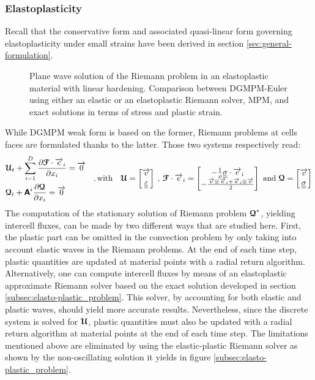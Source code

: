 \subsubsection{Elastoplasticity}
Recall that the conservative form and associated quasi-linear form governing elastoplasticity under small strains have been derived in section \ref{sec:general-formulation}.
\begin{figure}[h!]
  \centering
  { \label{subfig:ep_dgmpm_mpm1}}
  { \label{subfig:ep_dgmpm_mpm3}}
  {}
  \caption{Plane wave solution of the Riemann problem in an elastoplastic material with linear hardening. Comparison between DGMPM-Euler using either an elastic or an elastoplastic Riemann solver, MPM, and exact solutions in terms of stress and plastic strain.}
  \label{fig:RP_EP_dgmpm_mpm}
\end{figure}
While DGMPM weak form is based on the former, Riemann problems at cells faces are formulated thanks to the latter. Those two systems respectively read:
\begin{equation*}
  \begin{aligned}
  & {\boldsymbol{\mathcal{U}}}_t + \sum_{i=1}^D \frac{\partial {\boldsymbol{\mathcal{F}}}\cdot {\overrightarrow{e}}_i}{\partial x_i} = {\overrightarrow{0}} \\
  & {\boldsymbol{\mathcal{Q}}}_t + \boldsymbol{\mathsf{A}}^i \frac{\partial {\boldsymbol{\mathcal{Q}}}}{\partial x_i} = {\overrightarrow{0}}
  \end{aligned} \quad,\text{with}\quad {\boldsymbol{\mathcal{U}}} =\left[\begin{matrix}{\overrightarrow{v}} \\ {\underline{\underline{\varepsilon}}}\end{matrix}\right] \:,\: {\boldsymbol{\mathcal{F}}}\cdot{\overrightarrow{e}}_i = \left[\begin{matrix}-\frac{1}{\rho}{\underline{\underline{\sigma}}}\cdot{\overrightarrow{e}}_i\\-\frac{{\overrightarrow{v}}\otimes{\overrightarrow{e}}_i +{\overrightarrow{e}}_i \otimes{\overrightarrow{v}} }{2} \end{matrix}\right] \text{ and } {\boldsymbol{\mathcal{Q}}}=\left[\begin{matrix}{\overrightarrow{v}}\\ {\underline{\underline{\sigma}}}\end{matrix}\right]
\end{equation*}
The computation of the stationary solution of Riemann problem ${\boldsymbol{\mathcal{Q}}}^*$, yielding intercell fluxes, can be made by two different ways that are studied here.
First, the plastic part can be omitted in the convection problem by only taking into account elastic waves in the Riemann problems. At the end of each time step, plastic quantities are updated at material points with a radial return algorithm. %
Alternatively, one can compute intercell fluxes by means of an elastoplastic approximate Riemann solver based on the exact solution developed in section \ref{subsec:elasto-plastic_problem}. This solver, by accounting for both elastic and plastic waves, should yield more accurate results.
Nevertheless, since the discrete system is solved for ${\boldsymbol{\mathcal{U}}}$, plastic quantities must also be updated with a radial return algorithm at material points at the end of each time step. The limitations mentioned above are eliminated by using the elastic-plastic Riemann solver as shown by the non-oscillating solution it yields in figure \ref{subsec:elasto-plastic_problem}.

